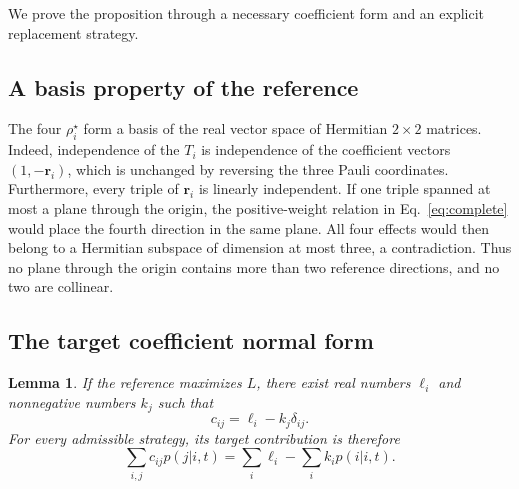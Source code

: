 \documentclass[11pt,a4paper]{article}
\newcommand{\rv}{\mathbf{r}}
\newtheorem{lemma}{Lemma}
\begin{document}
We prove the proposition through a necessary coefficient form and an explicit
replacement strategy.

\subsection{A basis property of the reference}

The four $\rho_i^\star$ form a basis of the real vector space of Hermitian
$2\times2$ matrices. Indeed, independence of the $T_i$ is independence of
the coefficient vectors $(1,-\rv_i)$, which is unchanged by reversing the
three Pauli coordinates. Furthermore, every triple of $\rv_i$ is linearly
independent. If one triple spanned at most a plane through the origin,
the positive-weight relation in Eq.~\eqref{eq:complete} would place the
fourth direction in the same plane. All four effects would then belong to
a Hermitian subspace of dimension at most three, a contradiction.
Thus no plane through the origin contains more than two reference directions,
and no two are collinear.

\subsection{The target coefficient normal form}

\begin{lemma}
\label{lem:normal}
If the reference maximizes $L$, there exist real numbers $\ell_i$ and
nonnegative numbers $k_j$ such that
\begin{equation}
 c_{ij}=\ell_i-k_j\delta_{ij}.
 \label{eq:normal}
\end{equation}
For every admissible strategy, its target contribution is therefore
\begin{equation}
 \sum_{i,j}c_{ij}p(j|i,t)=\sum_i\ell_i-\sum_i k_i p(i|i,t).
 \label{eq:penalty}
\end{equation}
\end{lemma}
\end{document}
